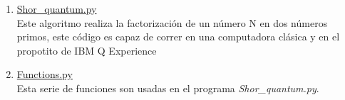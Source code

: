 \begin{enumerate}
    \item \label{cod:shorquanrum} \href{https://github.com/giovannilopez9808/Notas_Agosto_2020/blob/master/AMC/Proyecto_final/Scripts/General/Shor_quantum.py}{Shor\_quantum.py}\\
    Este algoritmo realiza la factorización de un número N en dos números primos, este código es capaz de correr en una computadora clásica y en el propotito de IBM Q Experience
    \item \href{https://github.com/giovannilopez9808/Notas_Agosto_2020/blob/master/AMC/Proyecto_final/Scripts/General/Functions.py}{Functions.py \label{cod:functionsshor}}\\
    Esta serie de funciones son usadas en el programa \textit{Shor\_quantum.py}.
\end{enumerate}